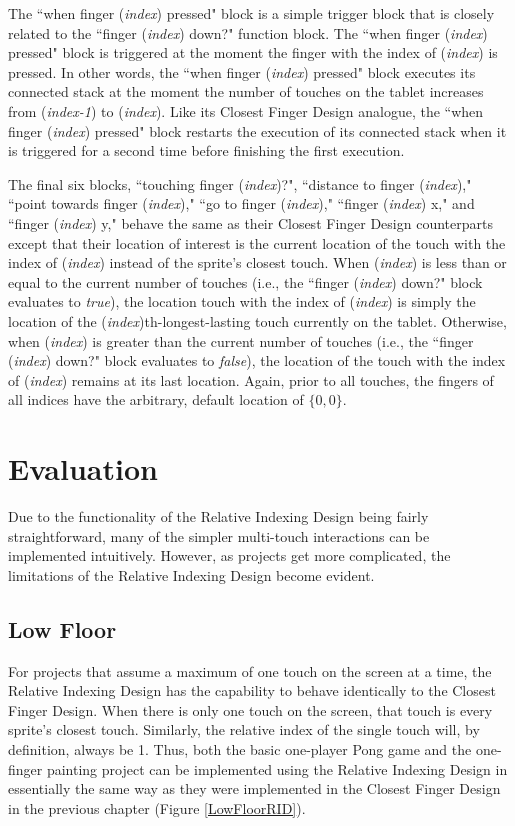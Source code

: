 The ``when finger (\emph{index}) pressed" block is a simple trigger block that is closely related to the ``finger (\emph{index}) down?" function block. The ``when finger (\emph{index}) pressed" block is triggered at the moment the finger with the index of (\emph{index}) is pressed. In other words, the ``when finger (\emph{index}) pressed" block executes its connected stack at the moment the number of touches on the tablet increases from (\emph{index-1}) to (\emph{index}). Like its Closest Finger Design analogue, the ``when finger (\emph{index}) pressed" block restarts the execution of its connected stack when it is triggered for a second time before finishing the first execution.

The final six blocks, ``touching finger (\emph{index})?", ``distance to finger (\emph{index})," ``point towards finger (\emph{index})," ``go to finger (\emph{index})," ``finger (\emph{index}) x," and ``finger (\emph{index}) y," behave the same as their Closest Finger Design counterparts except that their location of interest is the current location of the touch with the index of (\emph{index}) instead of the sprite's closest touch. When (\emph{index}) is less than or equal to the current number of touches (i.e., the ``finger (\emph{index}) down?" block evaluates to \emph{true}), the location touch with the index of (\emph{index}) is simply the location of the (\emph{index})th-longest-lasting touch currently on the tablet. Otherwise, when (\emph{index}) is greater than the current number of touches (i.e., the ``finger (\emph{index}) down?" block evaluates to \emph{false}), the location of the touch with the index of (\emph{index}) remains at its last location. Again, prior to all touches, the fingers of all indices have the arbitrary, default  location of $\{0,0\}$.

\section{Evaluation}

Due to the functionality of the Relative Indexing Design being fairly straightforward, many of the simpler multi-touch interactions can be implemented intuitively. However, as projects get more complicated, the limitations of the Relative Indexing Design become evident.

\subsection{Low Floor}
For projects that assume a maximum of one touch on the screen at a time, the  Relative Indexing Design has the capability to behave identically to the Closest Finger Design. When there is only one touch on the screen, that touch is every sprite's closest touch. Similarly, the relative index of the single touch will, by definition, always be 1. Thus, both the basic one-player Pong game and the one-finger painting project can be implemented using the Relative Indexing Design in essentially the same way as they were implemented in the Closest Finger Design in the previous chapter (Figure \ref{LowFloorRID}).

